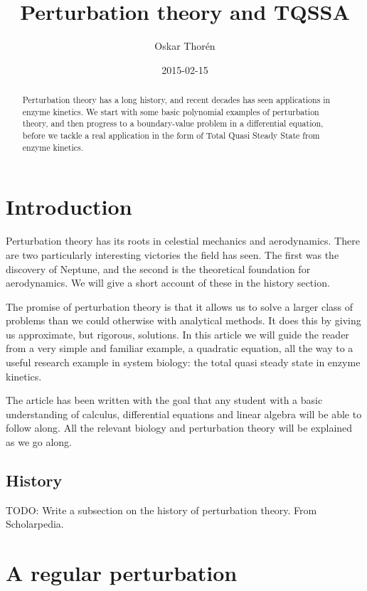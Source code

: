 \documentclass[12pt]{article}
\title{Perturbation theory and TQSSA}
\author{Oskar Thor\'{e}n}
\date{2015-02-15}
\begin{document}
\nocite{*} %
\maketitle

\begin{abstract}
Perturbation theory has a long history, and recent decades has seen applications
in enzyme kinetics. We start with some basic polynomial examples of perturbation
theory, and then progress to a boundary-value problem in a differential
equation, before we tackle a real application in the form of Total Quasi Steady
State from enzyme kinetics.
\end{abstract}

\clearpage
\tableofcontents
\clearpage

\section{Introduction}

Perturbation theory has its roots in celestial mechanics and aerodynamics. There
are two particularly interesting victories the field has seen. The first was the
discovery of Neptune, and the second is the theoretical foundation for
aerodynamics. We will give a short account of these in the history section.

The promise of perturbation theory is that it allows us to solve a
larger class of problems than we could otherwise with analytical methods. It
does this by giving us approximate, but rigorous, solutions. In this article we
will guide the reader from a very simple and familiar example, a quadratic
equation, all the way to a useful research example in system biology: the total
quasi steady state in enzyme kinetics.

The article has been written with the goal that any student with a basic
understanding of calculus, differential equations and linear algebra will be
able to follow along. All the relevant biology and perturbation theory will be
explained as we go along.

\subsection{History}

TODO: Write a subsection on the history of perturbation theory. From
Scholarpedia.

\section{A regular perturbation}
\end{document}
